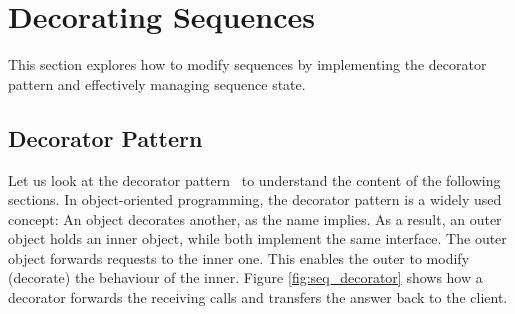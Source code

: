 \section{Decorating Sequences}
\label{sec:Decorating Sequences}
This section explores how to modify sequences by implementing the decorator 
pattern and effectively managing sequence state.

\subsection{Decorator Pattern}
\label{sub:Decorator Pattern}
Let us look at the decorator pattern~\cite[p.~226]{gang_of_four_depa} to understand the content of the 
following sections. In object-oriented programming, the decorator pattern is a 
widely used concept: An object decorates another, as the name implies. As a 
result, an outer object holds an inner object, while both implement the same 
interface. The outer object forwards requests to the inner one. This enables
the outer to modify (decorate) the behaviour of the inner.
Figure \ref{fig:seq_decorator} shows how a decorator forwards the receiving calls and 
transfers the answer back to the client.

